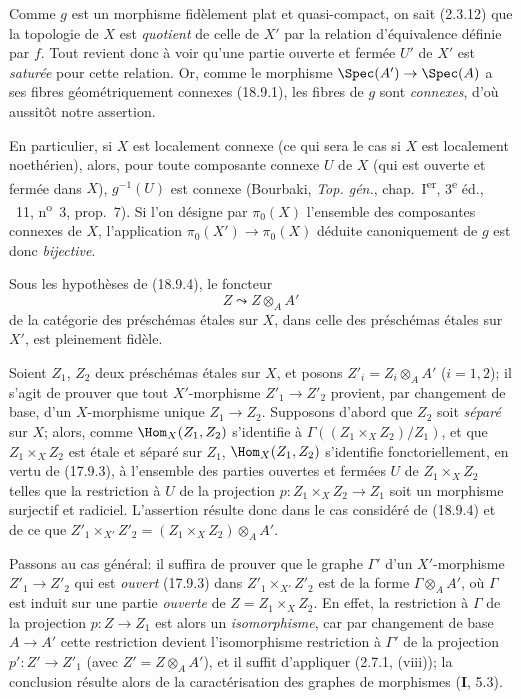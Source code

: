 Comme $g$ est un morphisme fidèlement plat et quasi-compact, on sait (2.3.12) que la topologie de $X$ est \emph{quotient} de celle de $X'$ par la relation d'équivalence définie par $f$. Tout revient donc à voir qu'une partie ouverte et fermée $U'$ de $X'$ est \emph{saturée} pour cette relation. Or, comme le morphisme $\Spec(A')\to\Spec(A)$ a ses fibres géométriquement connexes (18.9.1), les fibres de $g$ sont \emph{connexes}, d'où aussitôt notre assertion.

En particulier, si $X$ est localement connexe (ce qui sera le cas si $X$ est localement noethérien), alors, pour toute composante connexe $U$ de $X$ (qui est ouverte et fermée
dans $X$), $g^{-1}(U)$ est connexe (Bourbaki, \emph{Top. gén.}, chap.~I\textsuperscript{er}, 3\textsuperscript{e} éd., \textsection~11, n\textsuperscript{o}~3, prop.~7). Si l'on désigne par $\pi_0(X)$ l'ensemble des composantes connexes de $X$, l'application $\pi_0(X')\to\pi_0(X)$ déduite canoniquement de $g$ est donc \emph{bijective}.

\begin{corollary}[18.9.5]
\label{IV.18.9.5}
Sous les hypothèses de \textup{(18.9.4)}, le foncteur
\begin{equation}
  Z\leadsto Z\otimes_A A'
  \tag{18.9.5.1}
  \label{IV.18.9.5.1}
\end{equation}
de la catégorie des préschémas étales sur $X$, dans celle des préschémas étales sur $X'$, est pleinement fidèle.
\end{corollary}

Soient $Z_1$, $Z_2$ deux préschémas étales sur $X$, et posons $Z'_i=Z_i\otimes_A A'$ ($i=1,2$); il s'agit de prouver que tout $X'$-morphisme $Z'_1\to Z'_2$ provient, par changement de base, d'un $X$-morphisme unique $Z_1\to Z_2$. Supposons d'abord que $Z_2$ soit \emph{séparé} sur $X$; alors, comme $\Hom_X(Z_1,Z_2)$ s'identifie à $\Gamma((Z_1\times_X Z_2)/Z_1)$, et que $Z_1\times_X Z_2$ est étale et séparé sur $Z_1$, $\Hom_X(Z_1,Z_2)$ s'identifie fonctoriellement, en vertu de (17.9.3), à l'ensemble des parties ouvertes et fermées $U$ de $Z_1\times_X Z_2$ telles que la restriction à $U$ de la projection $p:Z_1\times_X Z_2\to Z_1$ soit un morphisme surjectif et radiciel. L'assertion résulte donc dans le cas considéré de (18.9.4) et de ce que $Z'_1\times_{X'}Z'_2=(Z_1\times_X Z_2)\otimes_A A'$.

Passons au cas général: il suffira de prouver que le graphe $\Gamma'$ d'un $X'$-morphisme $Z'_1\to Z'_2$ qui est \emph{ouvert} (17.9.3) dans $Z'_1\times_{X'}Z'_2$ est de la forme $\Gamma\otimes_A A'$, où $\Gamma$ est induit sur une partie \emph{ouverte} de $Z=Z_1\times_X Z_2$. En effet, la restriction à $\Gamma$ de la projection $p:Z\to Z_1$ est alors un \emph{isomorphisme}, car par changement de base $A\to A'$ cette restriction devient l'isomorphisme restriction à $\Gamma'$ de la projection $p':Z'\to Z'_1$ (avec $Z'=Z\otimes_A A'$), et il suffit d'appliquer (2.7.1, (viii)); la conclusion résulte alors de la caractérisation des graphes de morphismes (\textbf{I}, 5.3).

